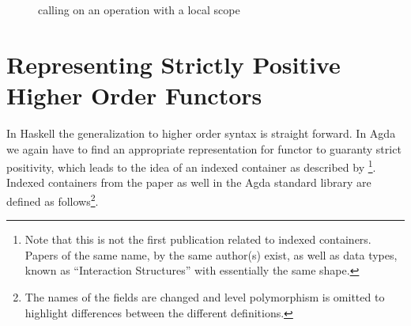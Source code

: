 \begin{figure}
  \begin{center}
  \end{center}
  \caption{calling \bind{} on an operation with a local scope}
  \label{higher-order:syntax:bind}
\end{figure}


\section{Representing Strictly Positive Higher Order Functors}
\label{higher-order:container}

In Haskell the generalization to higher order syntax is straight forward.
In Agda we again have to find an appropriate representation for functor to
guaranty strict positivity, which leads to the idea of an indexed container as
described by \textcite{DBLP:journals/jfp/AltenkirchGHMM15}
\footnote{Note that this is not the first publication related to indexed
  containers. Papers of the same name, by the same author(s) exist, as well as
  data types, known as ``Interaction Structures'' with essentially the same
  shape.}. 
Indexed containers from the paper as well in the Agda standard library are
defined as follows\footnote{The names of the fields are changed and level
  polymorphism is omitted to highlight differences between the different
  definitions.}.

